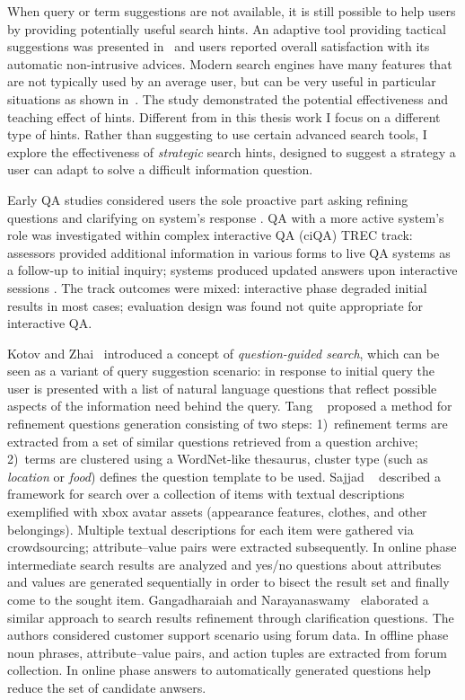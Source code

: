 When query or term suggestions are not available, it is still possible to help users by providing potentially useful search hints.
An adaptive tool providing tactical suggestions was presented in~\cite{Kriewel2010} and users reported overall satisfaction with its automatic non-intrusive advices.
Modern search engines have many features that are not typically used by an average user, but can be very useful in particular situations as shown in~\cite{Moraveji:2011:MIU:2009916.2009966}. The study demonstrated the potential effectiveness and teaching effect of hints.
Different from \cite{Moraveji:2011:MIU:2009916.2009966} in this thesis work I focus on a different type of hints.
Rather than suggesting to use certain advanced search tools, I explore the effectiveness of \textit{strategic} search hints, designed to suggest a strategy a user can adapt to solve a difficult information question.

Early QA studies considered users the sole proactive part asking refining questions and clarifying on system's response \cite{deboni2005}.
QA with a more active system's role was investigated within complex interactive QA (ciQA) TREC track: assessors provided additional information in various forms to live QA systems as a follow-up to initial inquiry; systems produced updated answers upon interactive sessions \cite{trec2007}.
The track outcomes were mixed: interactive phase degraded initial results in most cases; evaluation design was found not quite appropriate for interactive QA.

Kotov and Zhai~\cite{kotov2010} introduced a concept of \textit{question-guided search}, which can be seen as a variant of query suggestion scenario: in response to initial query the user is presented with a list of natural language questions that reflect possible aspects of the information need behind the query.
Tang \etal~\cite{tang2011} proposed a method for refinement questions generation consisting of two steps: 1)~refinement terms are extracted from a set of similar questions retrieved from a question archive; 2)~terms are  clustered using a WordNet-like thesaurus, cluster type (such as \textit{location} or \textit{food}) defines the question template to be used.
Sajjad \etal~\cite{sajjad12} described a framework for search over a collection of items with textual descriptions exemplified with xbox avatar assets (appearance features, clothes, and other belongings).
Multiple textual descriptions for each item were gathered via crowdsourcing; attribute--value pairs were extracted subsequently.
In online phase intermediate search results are analyzed and yes/no questions about attributes and values are generated sequentially in order to bisect the result set and finally come to the sought item.
Gangadharaiah and Narayanaswamy~\cite{gangadharaiah2013} elaborated a similar approach to search results refinement through clarification questions.
The authors considered customer support scenario using forum data.
In offline phase noun phrases, attribute--value pairs, and action tuples are extracted from forum collection.
In online phase answers to automatically generated questions help reduce the set of candidate anwsers.


